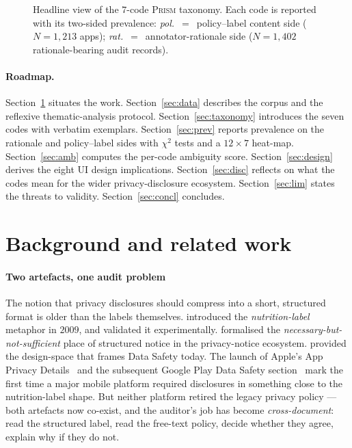 \documentclass[11pt,a4paper]{article}
\newcommand{\prism}{\textsc{Prism}}
\begin{document}
\begin{figure}[t]
\caption{Headline view of the $7$-code \prism{} taxonomy.
Each code is reported with its two-sided prevalence:
\emph{pol.}~$=$~policy--label content side ($N\!=\!1{,}213$ apps);
\emph{rat.}~$=$~annotator-rationale side ($N\!=\!1{,}402$
rationale-bearing audit records).}
\label{fig:taxonomy-hub}
\end{figure}

\paragraph{Roadmap.}
Section~\ref{sec:rw} situates the work. Section~\ref{sec:data}
describes the corpus and the reflexive thematic-analysis protocol.
Section~\ref{sec:taxonomy} introduces the seven codes with verbatim
exemplars. Section~\ref{sec:prev} reports prevalence on the rationale
and policy--label sides with $\chi^2$ tests and a $12\times 7$
heat-map. Section~\ref{sec:amb} computes the per-code ambiguity score.
Section~\ref{sec:design} derives the eight UI design implications.
Section~\ref{sec:disc} reflects on what the codes mean for the wider
privacy-disclosure ecosystem. Section~\ref{sec:lim} states the threats
to validity. Section~\ref{sec:concl} concludes.

\section{Background and related work}\label{sec:rw}

\paragraph{Two artefacts, one audit problem}
The notion that privacy disclosures should compress into a short,
structured format is older than the labels themselves. \citet{kelley2009nutrition}
introduced the \emph{nutrition-label} metaphor in $2009$, and
\citet{kelley2010standardizing} validated it experimentally. \citet{cranor2012necessary}
formalised the \emph{necessary-but-not-sufficient} place of structured
notice in the privacy-notice ecosystem. \citet{schaub2015design} provided
the design-space that frames Data Safety today. The launch of Apple's
App Privacy Details~\citep{appleprivacylabels2020} and the subsequent
Google Play Data Safety
section~\citep{googledatasafety2022} mark the first time a major mobile
platform required disclosures in something close to the nutrition-label
shape. But neither platform retired the legacy privacy policy --- both
artefacts now co-exist, and the auditor's job has become
\emph{cross-document}: read the structured label, read the free-text
policy, decide whether they agree, explain why if they do not.
\end{document}

